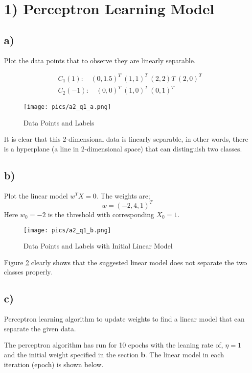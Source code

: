 \documentclass[11pt]{article}
\begin{document}
\section*{1) Perceptron Learning Model} 

\subsection*{a)} Plot the data points that to observe they are linearly separable. 

\begin{align*}
    &C_1 (1): \quad (0, 1.5)^T \ (1, 1)^T \ (2, 2)T \ (2, 0)^T \\
    &C_2 (-1): \quad (0, 0)^T \ (1, 0)^T \ (0, 1)^T
\end{align*}

\begin{figure}[H]
\centering
\texttt{[image: pics/a2\_q1\_a.png]}
\captionsetup{justification=centering}
\caption{Data Points and Labels}
\label{fig:q1a}
\end{figure}

It is clear that this 2-dimensional data is linearly separable, in other words, there is a hyperplane (a line in 2-dimensional space) that can distinguish two classes.

\subsection*{b)} Plot the linear model $w^T X = 0$. The weights are;
$$
w = (-2, 4, 1)^T
$$
Here $w_0 = -2$ is the threshold with corresponding $X_0 = 1$.

\begin{figure}[H]
\centering
\texttt{[image: pics/a2\_q1\_b.png]}
\captionsetup{justification=centering}
\caption{Data Points and Labels with Initial Linear Model}
\label{fig:q1b}
\end{figure}

Figure \ref{fig:q1b} clearly shows that the suggested linear model does not separate the two classes properly.

\subsection*{c)} Perceptron learning algorithm to update weights to find a linear model that can separate the given data. \medskip

The perceptron algorithm has run for 10 epochs with the leaning rate of, $\eta = 1$ and the initial weight specified in the section \textbf{b}. The linear model in each iteration (epoch) is shown below. \newpage
\end{document}
